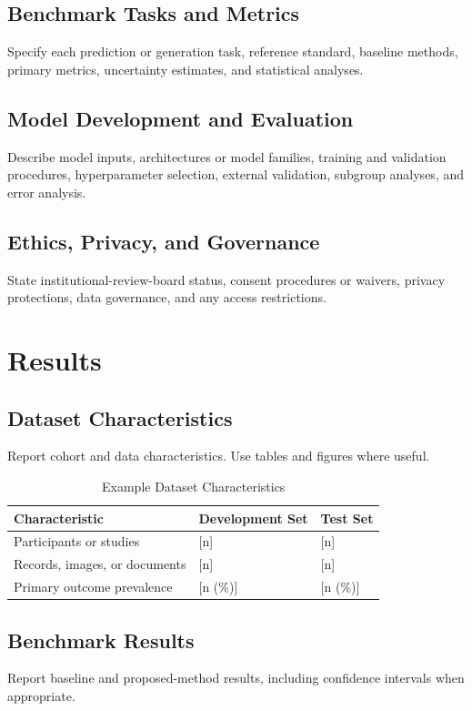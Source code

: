 \documentclass[11pt]{article}
\begin{document}
\subsection{Benchmark Tasks and Metrics}
Specify each prediction or generation task, reference standard, baseline methods, primary metrics, uncertainty estimates, and statistical analyses.

\subsection{Model Development and Evaluation}
Describe model inputs, architectures or model families, training and validation procedures, hyperparameter selection, external validation, subgroup analyses, and error analysis.

\subsection{Ethics, Privacy, and Governance}
State institutional-review-board status, consent procedures or waivers, privacy protections, data governance, and any access restrictions.

\section{Results}

\subsection{Dataset Characteristics}
Report cohort and data characteristics. Use tables and figures where useful.

\begin{table}[htbp]
	\centering
	\caption{Example Dataset Characteristics}
	\begin{tabular}{@{}lll@{}}
		\toprule
		Characteristic                & Development Set & Test Set \\
		\midrule
		Participants or studies       & [n]             & [n]      \\
		Records, images, or documents & [n]             & [n]      \\
		Primary outcome prevalence    & [n (\%)]        & [n (\%)] \\
		\bottomrule
	\end{tabular}
	\label{tab:dataset-characteristics}
\end{table}

\subsection{Benchmark Results}
Report baseline and proposed-method results, including confidence intervals when appropriate.
\end{document}
